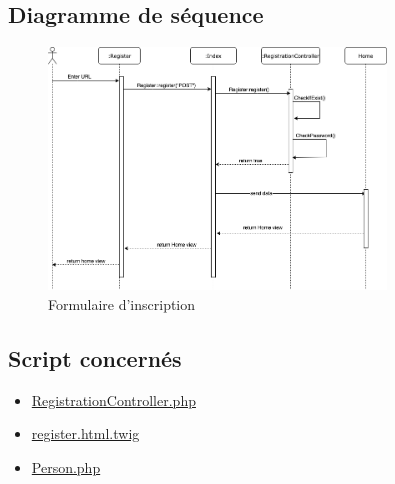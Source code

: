 \subsection{Diagramme de séquence}
	\begin{figure}[h]
		\includegraphics[width=0.8\textwidth,center]{Diagramme/sequence-us1}
		\caption{Formulaire d'inscription}
	\end{figure}
	
	
\subsection{Script concernés}
	\begin{itemize}
		\item \href{https://github.com/victorsmits/Aquabike/blob/master/backend/src/Controller/RegistrationController.php}{RegistrationController.php}
		\item \href{https://github.com/victorsmits/Aquabike/blob/master/backend/templates/registration/register.html.twig}{register.html.twig}
		\item \href{https://github.com/victorsmits/Aquabike/blob/master/backend/src/Entity/Person.php}{Person.php}
	\end{itemize}